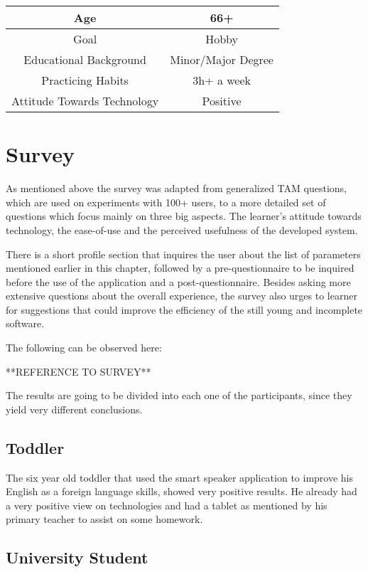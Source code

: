\begin{center}
	\begin{tabular}{ | c | c | }
	\hline
		Age & 66+ \\
	\hline
		Goal & Hobby \\
	\hline
		Educational Background & Minor/Major Degree \\
	\hline
		Practicing Habits & 3h+ a week \\
	\hline
		Attitude Towards Technology & Positive \\
	\hline

	\end{tabular}
\end{center}
 
\section{Survey}
As mentioned above the survey was adapted from generalized 
TAM questions, which are used on experiments with 100+ users, to a more detailed
set of questions which focus mainly on three big aspects. The learner's 
attitude towards technology, the ease-of-use and the perceived usefulness of
the developed system.

There is a short profile section that inquires the user about the list of 
parameters mentioned earlier in this chapter, followed by a pre-questionnaire
to be inquired before the use of the application 
and a post-questionnaire. Besides asking more extensive questions about the
overall experience, the survey also urges to learner for suggestions that could
improve the efficiency of the still young and incomplete software.

The following can be observed here:

**REFERENCE TO SURVEY**

The results are going to be divided into each one of the participants, since 
they yield very different conclusions.


\subsection{Toddler}
The six year old toddler that used the smart speaker application to improve
his English as a foreign language skills, showed very positive results. He
already had a very positive view on technologies and had a tablet as mentioned
by his primary teacher to assist on some homework.

\subsection{University Student}


